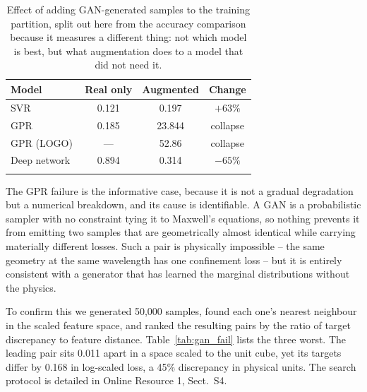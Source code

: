 \documentclass[iicol,pdflatex,sn-basic,Numbered]{sn-jnl}
\begin{document}
\begin{table}[t]
\caption{Effect of adding GAN-generated samples to the training partition, split
out here from the accuracy comparison because it measures a different thing:
not which model is best, but what augmentation does to a model that did not need
it.}\label{tab:augmentation}
\begin{tabular*}{\columnwidth}{@{\extracolsep\fill}lccc}
\toprule
Model & Real only & Augmented & Change \\
\midrule
SVR & 0.121 & 0.197 & $+63\%$ \\
GPR & 0.185 & 23.844 & collapse \\
GPR (LOGO) & --- & 52.86 & collapse \\
\midrule
Deep network~\cite{zelaci2021} & 0.894 & 0.314 & $-65\%$ \\
\botrule
\end{tabular*}
\end{table}

The GPR failure is the informative case, because it is not a gradual degradation
but a numerical breakdown, and its cause is identifiable. A GAN is a
probabilistic sampler with no constraint tying it to Maxwell's equations, so
nothing prevents it from emitting two samples that are geometrically almost
identical while carrying materially different losses. Such a pair is physically
impossible -- the same geometry at the same wavelength has one confinement loss --
but it is entirely consistent with a generator that has learned the marginal
distributions without the physics.

To confirm this we generated 50,000 samples, found each one's nearest neighbour
in the scaled feature space, and ranked the resulting pairs by the ratio of
target discrepancy to feature distance. Table~\ref{tab:gan_fail} lists the three
worst. The leading pair sits 0.011 apart in a space scaled to the unit cube, yet
its targets differ by 0.168 in log-scaled loss, a 45\% discrepancy in physical
units. The search protocol is detailed in Online Resource 1, Sect.~S4.
\end{document}
